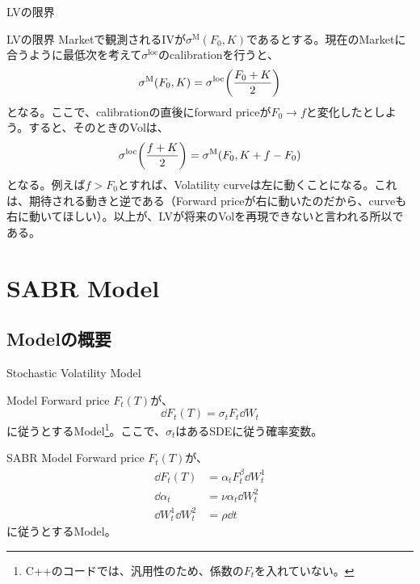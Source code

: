 \documentclass[dvipdfmx,9pt]{beamer}
\begin{document}
\begin{frame}{LVの限界}
  \begin{block}{LVの限界}
    Marketで観測されるIVが$\sigma^{\mathrm{M}}(F_{0},K)$であるとする。現在のMarketに合うように最低次を考えて$\sigma^{\mathrm{loc}}$のcalibrationを行うと、
    \begin{equation}
      \sigma^{\mathrm{M}}(F_{0},K) = \sigma^{\mathrm{loc}}\pqty{\frac{F_{0}+K}{2}}
    \end{equation}
    となる。ここで、calibrationの直後にforward priceが$F_{0} \to f$と変化したとしよう。すると、そのときのVolは、
    \begin{equation}
      \sigma^{\mathrm{loc}}\pqty{\frac{f+K}{2}} = \sigma^{\mathrm{M}}(F_{0},K+f-F_{0})
    \end{equation}
    となる。例えば$f>F_{0}$とすれば、Volatility curveは左に動くことになる。これは、期待される動きと逆である（Forward priceが右に動いたのだから、curveも右に動いてほしい）。以上が、LVが将来のVolを再現できないと言われる所以である。
  \end{block}
\end{frame}

\section{SABR Model}
\subsection{Modelの概要}
\begin{frame}{Stochastic Volatility Model}
  \begin{block}{Model}
    Forward price $F_{t}(T)$が、
    \begin{equation}
      \dd F_{t}(T) = \sigma_{t} F_{t} \dd W_{t}
    \end{equation}
    に従うとするModel\footnote{C++のコードでは、汎用性のため、係数の$F_{t}$を入れていない。}。ここで、$\sigma_{t}$はあるSDEに従う確率変数。
  \end{block}
  \begin{block}{SABR Model}
    Forward price $F_{t}(T)$が、
    \begin{align}
      \dd F_{t}(T)                & = \alpha_{t} F_{t}^{\beta} \dd W_{t}^{1} \\
      \dd \alpha_{t}              & = \nu \alpha_{t} \dd W_{t}^{2}           \\
      \dd W_{t}^{1} \dd W_{t}^{2} & = \rho \dd t
    \end{align}
    に従うとするModel。
  \end{block}
\end{frame}
\end{document}
